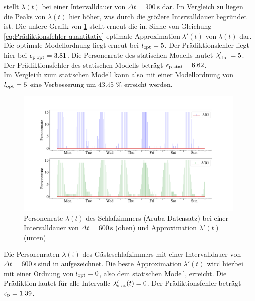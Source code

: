 stellt $\lambda(t)$ bei einer Intervalldauer von $\Delta t = \SI{900}{\second}$ dar. Im Vergleich zu  liegen die Peaks von $\lambda (t)$ hier höher, was durch die größere Intervalldauer begründet ist. Die untere Grafik von \ref{fig.bin_size_influence_master_bedroom_float_900} stellt erneut die im Sinne von Gleichung \ref{eq:Prädiktionsfehler quantitativ} optimale Approximation $\lambda ' (t)$ von $\lambda (t)$ dar. Die optimale Modellordnung liegt erneut bei $l_{\mathrm{opt}} = 5$. Der Prädiktionsfehler liegt hier bei $\epsilon_{\mathrm{p,opt}} =  3.81$. Die Personenrate des statischen Modells lautet $\lambda_{\mathrm{stat}} ' = 5$. Der Prädiktionsfehler des statischen Modells beträgt $\epsilon_{\mathrm{p,stat}} = 6.62$. \\
Im Vergleich zum statischen Modell kann also mit einer Modellordnung von $l_{\mathrm{opt}} = 5$ eine Verbesserung um 43.45 \% erreicht werden.

\begin{figure}[!h]
	\begin{center}
		\includegraphics[width=\linewidth]{Abbildungen/evaluation/bin_size_influence_master_bedroom_float_900.pdf}
		\caption[Personenrate $\lambda (t)$ des Schlafzimmers bei einer Intervalldauer von  $\Delta t = \SI{600}{\second}$ und Approximation $\lambda '(t)$]{Personenrate $\lambda (t)$ des Schlafzimmers (Aruba-Datensatz) bei einer Intervalldauer von  $\Delta t = \SI{600}{\second}$ (oben) und Approximation $\lambda '(t)$ (unten)}
		\label{fig.bin_size_influence_master_bedroom_float_900}
	\end{center}
\end{figure}

Die Personenraten $\lambda(t)$ des Gästeschlafzimmers mit einer Intervalldauer von $\Delta t = \SI{600}{\second}$ sind in  aufgezeichnet. Die beste Approximation $\lambda ' (t)$ wird hierbei mit einer Ordnung von $l_{\mathrm{opt}} = 0$, also dem statischen Modell, erreicht. Die Prädiktion lautet für alle Intervalle $\lambda_{\mathrm{stat}} ' (t) = 0$. Der Prädiktionsfehler  beträgt $\epsilon_{\mathrm{p}} = 1.39$. 


